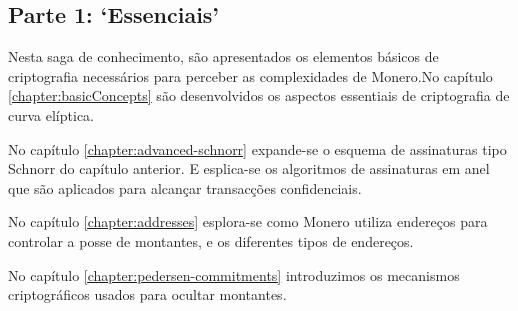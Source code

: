 

\subsection{Parte 1: `Essenciais'}

Nesta saga de conhecimento, são apresentados os elementos básicos de criptografia necessários para perceber as complexidades de Monero.\newline No capítulo \ref{chapter:basicConcepts} são desenvolvidos os aspectos essentiais de criptografia de curva elíptica.  

\newline No capítulo \ref{chapter:advanced-schnorr} expande-se o esquema de assinaturas tipo Schnorr do capítulo anterior. E esplica-se os algoritmos de assinaturas em anel que são aplicados para alcançar transacções confidenciais.


No capítulo \ref{chapter:addresses} esplora-se como Monero utiliza endereços para controlar a posse de montantes, e os diferentes tipos de endereços.

No capítulo \ref{chapter:pedersen-commitments} introduzimos os mecanismos criptográficos usados para ocultar montantes. 

